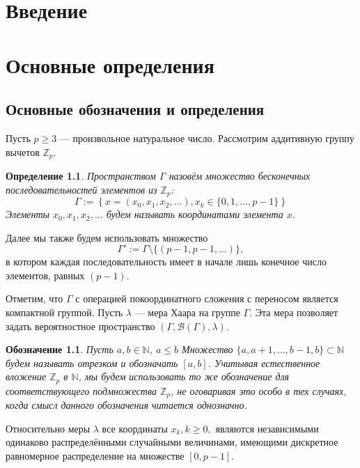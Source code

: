 \documentclass[14pt, a4paper, russian]{report}
\newtheorem{definition}{\indent Определение}
\newtheorem{notation}{\indent Обозначение}
\begin{document}
\tableofcontents{}

\chapter*{Введение}



\chapter{Основные определения}

\section{Основные обозначения и определения}

Пусть $p \ge 3$ --- произвольное натуральное число. Рассмотрим аддитивную группу вычетов $\mathbb{Z}_p$. 

\begin{definition}
Пространством $\Gamma$ назовём множество бесконечных последовательностей элементов из $\mathbb{Z}_p$:
$$\Gamma := \left\{x = \left(x_0, x_1, x_2, \ldots \right), x_k \in \{0, 1, \ldots, p - 1\} \right\}$$
Элементы $x_0, x_1, x_2, \ldots$ будем называть координатами элемента $x$.
\end{definition}
Далее мы также будем использовать множество 
$$\Gamma' := \Gamma \setminus \{(p-1,p-1,\ldots)\},$$
в котором каждая последовательность имеет в начале лишь конечное число элементов, равных $(p-1)$.

Отметим, что $\Gamma$ с операцией покоординатного сложения с переносом является компактной группой. Пусть $\lambda$ --- мера Хаара на группе $\Gamma$. Эта мера позволяет задать вероятностное пространство $(\Gamma, \mathcal{B}(\Gamma), \lambda)$.

\begin{notation} 
Пусть $a, b \in \mathbb{N},\ a \le b$ Множество $\{a, a+1, \ldots, b-1, b\} \subset \mathbb{N}$ будем называть отрезком и обозначать $\left[a, b\right]$. Учитывая естественное вложение $\mathbb{Z}_p$ в $\mathbb{N}$, мы будем использовать то же обозначение для соответствующего подмножества $\mathbb{Z}_p$, не оговаривая это особо в тех случаях, когда смысл данного обозначения читается однозначно.
\end{notation}

Относительно меры $\lambda$ все координаты $x_k, k \ge 0,$ являются независимыми одинаково распределёнными случайными величинами, имеющими дискретное равномерное распределение на множестве $\left[0, p-1\right]$. 
\end{document}

